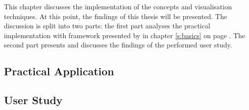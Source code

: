 This chapter discusses the implementation of the concepts and visualisation techniques. At this point, the findings of this thesis will be presented. The discussion is split into two parts: the first part analyses the practical implementation with framework presented by \citeauthor{Munzner2014} in chapter \ref{s:basics} on page \pageref{s:basics}. The second part presents and discusses the findings of the performed user study.

\subsection{Practical Application}


\subsection{User Study}
